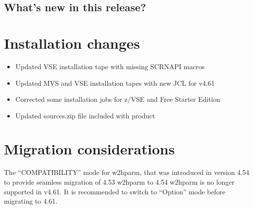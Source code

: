 \documentclass[letterpaper,10pt,english]{sphinxmanual}
\begin{document}
\section{What’s new in this release?}
\label{\detokenize{Getting_Started:what-s-new-in-this-release}}

\chapter{Installation changes}
\label{\detokenize{Getting_Started:installation-changes}}
\begin{itemize}
\item {} 
Updated VSE installation tape with missing SCRNAPI macros

\end{itemize}

\begin{itemize}
\item {} 
Updated MVS and VSE installation tapes with new JCL for v4.61

\end{itemize}

\begin{itemize}
\item {} 
Corrected some installation jobs for z/VSE and Free Starter Edition

\end{itemize}

\begin{itemize}
\item {} 
Updated sources.zip file included with product

\end{itemize}


\chapter{Migration considerations}
\label{\detokenize{Getting_Started:migration-considerations}}

The “COMPATIBILITY” mode for w2hparm, that was introduced in version 4.54 to provide seamless migration of 4.53 w2hparm to 4.54 w2hparm is no longer supported in v4.61. It is recommended to switch to “Option” mode before migrating to 4.61.
\end{document}

